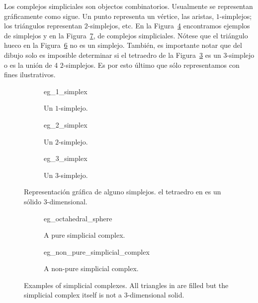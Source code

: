 \documentclass{standalone}
\begin{document}
	Los complejos simpliciales son objectos combinatorios. Usualmente se representan gráficamente como sigue. Un punto representa un vértice, las aristas,  $1$-simplejos; los triángulos representan $2$-simplejos, etc. En la Figura~\ref{fig:eg_simplex} encontramos ejemplos de simplejos y en la Figura~\ref{fig:eg_simplicial_complex}, de complejos simpliciales. Nótese que el triángulo hueco en la Figura~\ref{fig:eg_non_pure} no es un simplejo. También, es importante notar que del dibujo solo es imposible determinar si el tetraedro de la Figura~\ref{fig:3_simplex} es un $3$-simplejo o es la unión de 4 $2$-simplejos. Es por esto último que sólo representamos con fines ilustrativos.
	
	\begin{figure}[h]
		\centering
		\begin{subfigure}{.3\textwidth}
			\centering
			{eg_1_simplex}
			\caption{Un $1$-simplejo.}
			\label{fig:1_simplex}
		\end{subfigure}
		\begin{subfigure}{.3\textwidth}
			\centering
			{eg_2_simplex}
			\caption{Un $2$-simplejo.}
			\label{fig:2_simplex}
		\end{subfigure}
		\begin{subfigure}{.3\textwidth}
			\centering
			{eg_3_simplex}
			\caption{Un $3$-simplejo.}
			\label{fig:3_simplex}
		\end{subfigure}
		\caption{Representación gráfica de alguno simplejos. el tetraedro en  es un sólido $3$-dimensional.}
		\label{fig:eg_simplex}
	\end{figure}
	\begin{figure}[h]
		\centering
		\begin{subfigure}{.4\textwidth}
			\centering
			{eg_octahedral_sphere}
			\caption{A pure simplicial complex.}
			\label{fig:eg_octahedral_sphere}
		\end{subfigure}
		\begin{subfigure}{.4\textwidth}
			\centering
			{eg_non_pure_simplicial_complex}
			\caption{A non-pure simplicial complex.}
			\label{fig:eg_non_pure}
		\end{subfigure}
		\caption{Examples of simplicial complexes. All triangles in  are filled but the simplicial complex itself is not a $3$-dimensional solid.}
		\label{fig:eg_simplicial_complex}
	\end{figure}
	
\end{document}
